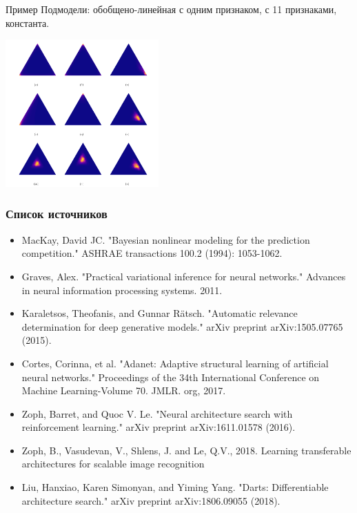 \documentclass[10pt,pdf,utf8,russian,aspectratio=169]{beamer}
\begin{document}
\begin{frame}{Пример}
Подмодели: обобщено-линейная с одним признаком, с 11 признаками, константа.
\begin{center}
\includegraphics[width=0.44\textwidth]{example2.png}
\end{center}
\end{frame}



\begin{frame}
\frametitle{Список источников}
\begin{itemize}
\item MacKay, David JC. "Bayesian nonlinear modeling for the prediction competition." ASHRAE transactions 100.2 (1994): 1053-1062.
\item Graves, Alex. "Practical variational inference for neural networks." Advances in neural information processing systems. 2011.
\item Karaletsos, Theofanis, and Gunnar Rätsch. "Automatic relevance determination for deep generative models." arXiv preprint arXiv:1505.07765 (2015).
\item Cortes, Corinna, et al. "Adanet: Adaptive structural learning of artificial neural networks." Proceedings of the 34th International Conference on Machine Learning-Volume 70. JMLR. org, 2017.
\item Zoph, Barret, and Quoc V. Le. "Neural architecture search with reinforcement learning." arXiv preprint arXiv:1611.01578 (2016).
\item Zoph, B., Vasudevan, V., Shlens, J. and Le, Q.V., 2018. Learning transferable architectures for scalable image recognition
\item Liu, Hanxiao, Karen Simonyan, and Yiming Yang. "Darts: Differentiable architecture search." arXiv preprint arXiv:1806.09055 (2018).
\end{itemize}
\end{frame}
\end{document}

